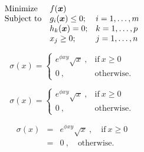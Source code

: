 \documentclass[a4paper]{article}
\begin{document}
    \begin{equation*}
        \begin{array}{lll}
        \mbox{Minimize}
        & f(\mbox{\boldmath{$x$}}) &\\
        \mbox{Subject to}
        & g_i(\mbox{\boldmath{$x$}}) \leq 0 ; &
        i=1,\ldots,m\\
        & h_k(\mbox{\boldmath{$x$}}) = 0 ; &
        k=1,\ldots,p\\
        & x_j \geq 0 ; & j=1,\ldots,n
        \end{array}
    \end{equation*}


    \begin{equation}
        \sigma(x) = \begin{cases}
        e^{\phi xy} \sqrt{x}~,
        & \text{if} ~x\geq 0\\
        0~, & \text{otherwise.}
        \end{cases}
        \end{equation}
    
        \begin{equation}
            \sigma(x) = \left\{\begin{array}{rl}
            e^{\phi xy} \sqrt{x}~,
            & \text{if}~ x\geq 0\\
            0~, & \text{otherwise.}
            \end{array}\right.
        \end{equation}
        
        \begin{eqnarray}
            \sigma(x) &=& e^{\phi xy} \sqrt{x}~,\quad
            \text{if}~ x\geq 0\\
            &=& 0~,\quad \text{otherwise.}
        \end{eqnarray}
    
\end{document}
